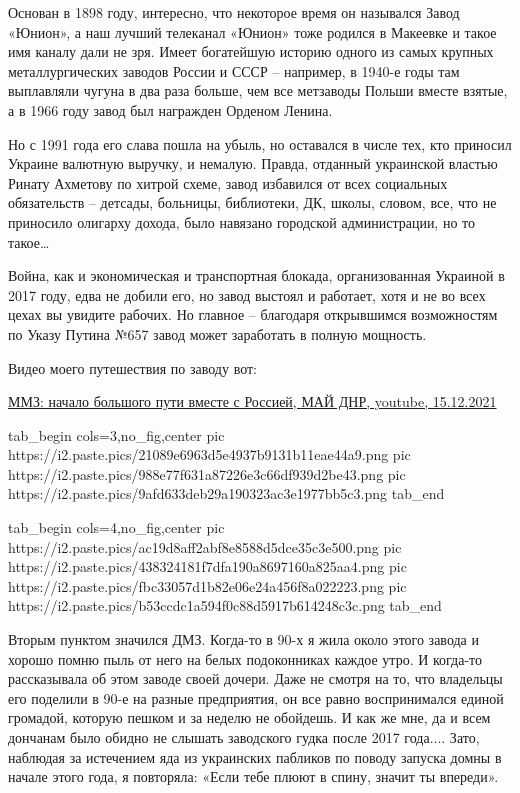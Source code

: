 
Основан в 1898 году, интересно, что некоторое время он назывался Завод «Юнион»,
а наш лучший телеканал «Юнион» тоже родился в Макеевке и такое имя каналу дали
не зря. Имеет богатейшую историю одного из самых крупных металлургических
заводов России и СССР – например, в 1940-е годы там выплавляли чугуна в два
раза больше, чем все метзаводы Польши вместе взятые, а в 1966 году завод был
награжден Орденом Ленина.

Но с 1991 года его слава пошла на убыль, но оставался в числе тех, кто приносил
Украине валютную выручку, и немалую. Правда, отданный украинской властью Ринату
Ахметову по хитрой схеме, завод избавился от всех социальных обязательств –
детсады, больницы, библиотеки, ДК, школы, словом, все, что не приносило
олигарху дохода, было навязано городской администрации, но то такое…

Война, как и экономическая и транспортная блокада, организованная Украиной в
2017 году, едва не добили его, но завод выстоял и работает, хотя и не во всех
цехах вы увидите рабочих. Но главное – благодаря открывшимся возможностям по
Указу Путина №657 завод может заработать в полную мощность.

Видео моего путешествия по заводу вот:

\href{https://www.youtube.com/watch?v=YbKnjqbMhrI}{%
ММЗ: начало большого пути вместе с Россией, МАЙ ДНР, youtube, 15.12.2021%
}

\ifcmt
  tab_begin cols=3,no_fig,center
     pic https://i2.paste.pics/21089e6963d5e4937b9131b11eae44a9.png
		 pic https://i2.paste.pics/988e77f631a87226e3c66df939d2be43.png
		 pic https://i2.paste.pics/9afd633deb29a190323ac3e1977bb5c3.png
  tab_end

  tab_begin cols=4,no_fig,center
	   pic https://i2.paste.pics/ac19d8aff2abf8e8588d5dce35c3e500.png
		 pic https://i2.paste.pics/438324181f7dfa190a8697160a825aa4.png
		 pic https://i2.paste.pics/fbc33057d1b82e06e24a456f8a022223.png
		 pic https://i2.paste.pics/b53ccdc1a594f0c88d5917b614248c3c.png
  tab_end
\fi

Вторым пунктом значился ДМЗ. Когда-то в 90-х я жила около этого завода и хорошо
помню пыль от него на белых подоконниках каждое утро. И когда-то рассказывала
об этом заводе своей дочери. Даже не смотря на то, что владельцы его поделили в
90-е на разные предприятия, он все равно воспринимался единой громадой, которую
пешком и за неделю не обойдешь. И как же мне, да и всем дончанам было обидно не
слышать заводского гудка после 2017 года.... Зато, наблюдая за истечением яда из
украинских пабликов по поводу запуска домны в начале этого года, я повторяла:
«Если тебе плюют в спину, значит ты впереди».

